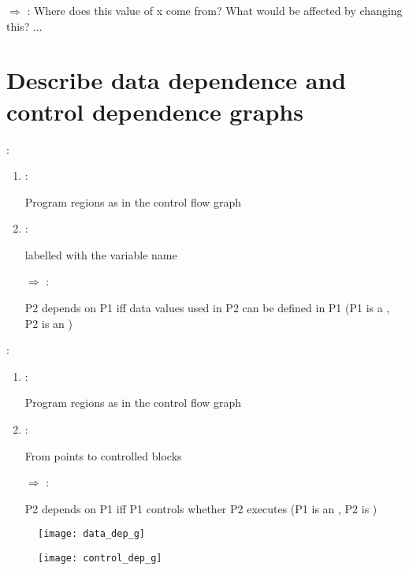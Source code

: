 $\Rightarrow$  : Where does this value of x come from? What would be affected by changing this? ...

\section{Describe data dependence and control dependence graphs}

\begin{minipage}[t]{0.48\textwidth}
     :
    \begin{enumerate}
        \item {} :
        
        Program regions as in the control flow graph
        \item {} :
        
         labelled with the variable name
        \vspace{11pt}
        \item[$\Rightarrow$]  :
        
        P2 depends on P1 iff data values used in P2 can be defined in P1 (P1 is a         , P2 is an )
    \end{enumerate}
\end{minipage}
\hfill
\begin{minipage}[t]{0.48\textwidth}
     :
    \begin{enumerate}
        \item {} :
        
        Program regions as in the control flow graph
        \item {} :
        
        From  points to controlled blocks
        \item[$\Rightarrow$]  :
        
        P2 depends on P1 iff P1 controls whether P2 executes (P1 is an , P2 is )
    \end{enumerate}
\end{minipage}

\begin{minipage}{0.48\textwidth}
    \begin{figure}[H]
        \centering
        \texttt{[image: data\_dep\_g]}
    \end{figure}
\end{minipage}
\hfill
\begin{minipage}{0.48\textwidth}
    \begin{figure}[H]
        \centering
        \texttt{[image: control\_dep\_g]}
    \end{figure}
\end{minipage}

